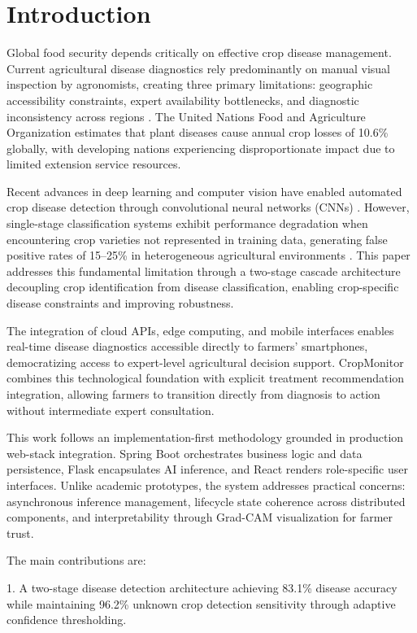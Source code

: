 \documentclass[conference]{IEEEtran}
\begin{document}
\section{Introduction}

Global food security depends critically on effective crop disease management. Current agricultural disease diagnostics rely predominantly on manual visual inspection by agronomists, creating three primary limitations: geographic accessibility constraints, expert availability bottlenecks, and diagnostic inconsistency across regions \cite{ref01}. The United Nations Food and Agriculture Organization estimates that plant diseases cause annual crop losses of 10.6\% globally, with developing nations experiencing disproportionate impact due to limited extension service resources.

Recent advances in deep learning and computer vision have enabled automated crop disease detection through convolutional neural networks (CNNs) \cite{ref02}. However, single-stage classification systems exhibit performance degradation when encountering crop varieties not represented in training data, generating false positive rates of 15--25\% in heterogeneous agricultural environments \cite{ref03}. This paper addresses this fundamental limitation through a two-stage cascade architecture decoupling crop identification from disease classification, enabling crop-specific disease constraints and improving robustness.

The integration of cloud APIs, edge computing, and mobile interfaces enables real-time disease diagnostics accessible directly to farmers' smartphones, democratizing access to expert-level agricultural decision support. CropMonitor combines this technological foundation with explicit treatment recommendation integration, allowing farmers to transition directly from diagnosis to action without intermediate expert consultation.

This work follows an implementation-first methodology grounded in production web-stack integration. Spring Boot orchestrates business logic and data persistence, Flask encapsulates AI inference, and React renders role-specific user interfaces. Unlike academic prototypes, the system addresses practical concerns: asynchronous inference management, lifecycle state coherence across distributed components, and interpretability through Grad-CAM visualization for farmer trust.

The main contributions are:

1. A two-stage disease detection architecture achieving 83.1\% disease accuracy while maintaining 96.2\% unknown crop detection sensitivity through adaptive confidence thresholding.
\end{document}
